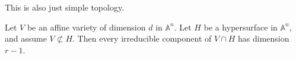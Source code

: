 \begin{solution}
    This is also just simple topology.
\end{solution}
%
%
%
\begin{exercise}[1.8.]
    Let \(V\) be an affine variety of dimension \(d\) in \(\mathbb{A}^n\). Let \(H\) be a hypersurface in \(\mathbb{A}^n\), and assume \(V \not\subset H\). Then every irreducible component of \(V \cap H\) has dimension \(r - 1\).
\end{exercise}
\begin{solution}
    
\end{solution}